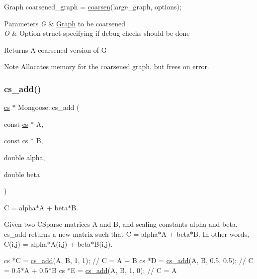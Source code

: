 \begin{DoxyCode}
Graph coarsened\_graph = \hyperlink{namespace_mongoose_a449a68ce1571bc656fe05abd1fc6bbc8}{coarsen}(large\_graph, options);
\end{DoxyCode}



\begin{DoxyParams}{Parameters}
{\em G} & \hyperlink{class_mongoose_1_1_graph}{Graph} to be coarsened \\
\hline
{\em O} & Option struct specifying if debug checks should be done \\
\hline
\end{DoxyParams}
\begin{DoxyReturn}{Returns}
A coarsened version of G 
\end{DoxyReturn}
\begin{DoxyNote}{Note}
Allocates memory for the coarsened graph, but frees on error. 
\end{DoxyNote}
\hypertarget{namespace_mongoose_a2153d61eda5ac1e1b70617e8cf8cde33}{}\label{namespace_mongoose_a2153d61eda5ac1e1b70617e8cf8cde33} 
\subsubsection{\texorpdfstring{cs\+\_\+add()}{cs\_add()}}
{\footnotesize\ttfamily \hyperlink{struct_mongoose_1_1cs__sparse}{cs} $\ast$ Mongoose\+::cs\+\_\+add (\begin{DoxyParamCaption}\item[{const \hyperlink{struct_mongoose_1_1cs__sparse}{cs} $\ast$}]{A,  }\item[{const \hyperlink{struct_mongoose_1_1cs__sparse}{cs} $\ast$}]{B,  }\item[{double}]{alpha,  }\item[{double}]{beta }\end{DoxyParamCaption})}



C = alpha$\ast$A + beta$\ast$B. 

Given two C\+Sparse matrices {\ttfamily A} and {\ttfamily B}, and scaling constants {\ttfamily alpha} and {\ttfamily beta}, cs\+\_\+add returns a new matrix such that C = alpha$\ast$A + beta$\ast$B. In other words, C(i,j) = alpha$\ast$A(i,j) + beta$\ast$B(i,j).


\begin{DoxyCode}
cs *C = \hyperlink{namespace_mongoose_a2153d61eda5ac1e1b70617e8cf8cde33}{cs\_add}(A, B, 1, 1);     \textcolor{comment}{// C = A + B}
cs *D = \hyperlink{namespace_mongoose_a2153d61eda5ac1e1b70617e8cf8cde33}{cs\_add}(A, B, 0.5, 0.5); \textcolor{comment}{// C = 0.5*A + 0.5*B}
cs *E = \hyperlink{namespace_mongoose_a2153d61eda5ac1e1b70617e8cf8cde33}{cs\_add}(A, B, 1, 0);     \textcolor{comment}{// C = A}
\end{DoxyCode}




